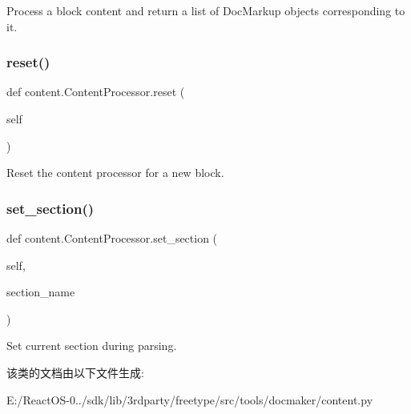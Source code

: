 \begin{DoxyVerb}Process a block content and return a list of DocMarkup objects
   corresponding to it.\end{DoxyVerb}
 \mbox{\label{classcontent_1_1_content_processor_a50270833594711e862d06e5fea9131fa}} 
\subsubsection{\texorpdfstring{reset()}{reset()}}
{\footnotesize\ttfamily def content.\+Content\+Processor.\+reset (\begin{DoxyParamCaption}\item[{}]{self }\end{DoxyParamCaption})}

\begin{DoxyVerb}Reset the content processor for a new block.\end{DoxyVerb}
 \mbox{\label{classcontent_1_1_content_processor_a14e1401ef31e9e27d18a5d526697305f}} 
\subsubsection{\texorpdfstring{set\+\_\+section()}{set\_section()}}
{\footnotesize\ttfamily def content.\+Content\+Processor.\+set\+\_\+section (\begin{DoxyParamCaption}\item[{}]{self,  }\item[{}]{section\+\_\+name }\end{DoxyParamCaption})}

\begin{DoxyVerb}Set current section during parsing.\end{DoxyVerb}
 

该类的文档由以下文件生成\+:\begin{DoxyCompactItemize}
\item 
E\+:/\+React\+O\+S-\/0../sdk/lib/3rdparty/freetype/src/tools/docmaker/content.\+py\end{DoxyCompactItemize}
